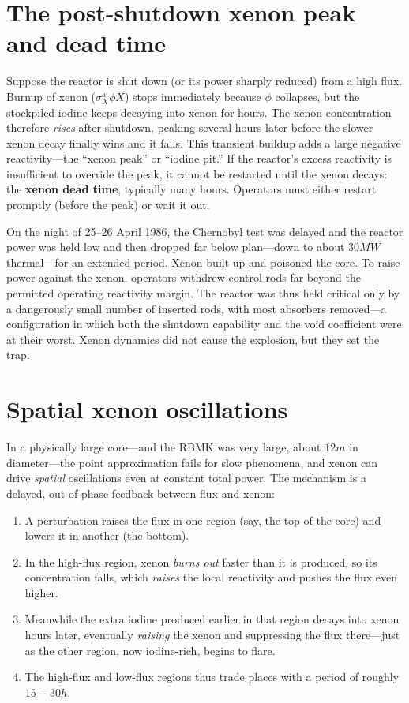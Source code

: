 \section{The post-shutdown xenon peak and dead time}

Suppose the reactor is shut down (or its power sharply reduced) from a high flux.
Burnup of xenon ($\sigma_X^a\phi X$) stops immediately because $\phi$ collapses,
but the stockpiled iodine keeps decaying into xenon for hours. The xenon
concentration therefore \emph{rises} after shutdown, peaking several hours later
before the slower xenon decay finally wins and it falls. This transient buildup
adds a large negative reactivity---the ``xenon peak'' or ``iodine pit.'' If the
reactor's excess reactivity is insufficient to override the peak, it cannot be
restarted until the xenon decays: the \textbf{xenon dead time}, typically many
hours. Operators must either restart promptly (before the peak) or wait it out.

\begin{remark}
On the night of 25--26 April 1986, the Chernobyl test was delayed and the reactor
power was held low and then dropped far below plan---down to about $30\unit{MW}$
thermal---for an extended period. Xenon built up and poisoned the core. To raise
power against the xenon, operators withdrew control rods far beyond the permitted
operating reactivity margin. The reactor was thus held critical only by a
dangerously small number of inserted rods, with most absorbers removed---a
configuration in which both the shutdown capability and the void coefficient were
at their worst. Xenon dynamics did not cause the explosion, but they set the
trap.
\end{remark}

\section{Spatial xenon oscillations}

In a physically large core---and the RBMK was very large, about $12\unit{m}$ in
diameter---the point approximation fails for slow phenomena, and xenon can drive
\emph{spatial} oscillations even at constant total power. The mechanism is a
delayed, out-of-phase feedback between flux and xenon:

\begin{enumerate}[nosep]
\item A perturbation raises the flux in one region (say, the top of the core) and
lowers it in another (the bottom).
\item In the high-flux region, xenon \emph{burns out} faster than it is produced,
so its concentration falls, which \emph{raises} the local reactivity and pushes
the flux even higher.
\item Meanwhile the extra iodine produced earlier in that region decays into
xenon hours later, eventually \emph{raising} the xenon and suppressing the flux
there---just as the other region, now iodine-rich, begins to flare.
\item The high-flux and low-flux regions thus trade places with a period of
roughly $15\!-\!30\unit{h}$.
\end{enumerate}

